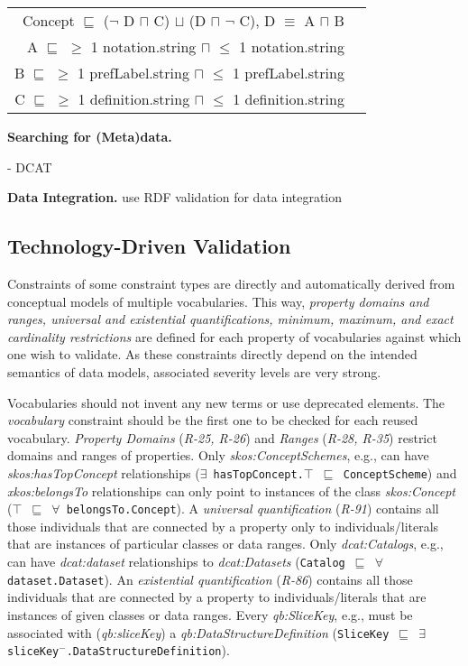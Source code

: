 \documentclass{llncs}
\newcommand{\ms}[1]{\texttt{#1}}
\newenvironment{DL}{
  \vspace{0cm}
  \begin{tabular}{r l}

}{
  \end{tabular}
}
\begin{document}
{{\begin{center}
\begin{DL}
Concept $\sqsubseteq$ ($\neg$ D $\sqcap$ C) $\sqcup$ (D $\sqcap$ $\neg$ C), D $\equiv$ A $\sqcap$ B \\
A $\sqsubseteq$ $\geq$ 1 notation.string $\sqcap$ $\leq$ 1 notation.string \\
B $\sqsubseteq$ $\geq$ 1 prefLabel.string $\sqcap$ $\leq$ 1 prefLabel.string \\
C $\sqsubseteq$ $\geq$ 1 definition.string $\sqcap$ $\leq$ 1 definition.string \\
\end{DL}
\end{center}

\textbf{Searching for (Meta)data.}

- DCAT

\textbf{Data Integration.}
use RDF validation for data integration

\subsection{Technology-Driven Validation}
\label{technology-driven-validation}

Constraints of some constraint types are directly and automatically derived from conceptual models of multiple vocabularies.
This way, \emph{property domains and ranges, universal and existential quantifications, minimum, maximum, and exact cardinality restrictions} are defined for each property of vocabularies against which one wish to validate.
As these constraints directly depend on the intended semantics of data models, associated severity levels are very strong.

Vocabularies should not invent any new terms or use deprecated elements.
The \emph{vocabulary} constraint should be the first one to be checked for each reused vocabulary.
\emph{Property Domains} (\emph{R-25, R-26}) and \emph{Ranges} (\emph{R-28, R-35}) restrict domains and ranges of properties.
Only \emph{skos:ConceptSchemes}, e.g., can have \emph{skos:hasTopConcept} relationships (\ms{$\exists$ hasTopConcept.$\top$ $\sqsubseteq$ ConceptScheme}) and
\emph{xkos:belongsTo} relationships can only point to instances of the class \emph{skos:Concept} (\ms{$\top$ $\sqsubseteq$ $\forall$ belongsTo.Concept}).
A \emph{universal quantification} (\emph{R-91}) contains all those individuals that are connected by a property only to individuals/literals that are instances of particular classes  or data ranges.
Only \emph{dcat:Catalogs}, e.g., can have \emph{dcat:dataset} relationships to \emph{dcat:Datasets} (\ms{Catalog $\sqsubseteq$ $\forall$ dataset.Dataset}).
An \emph{existential quantification} (\emph{R-86}) contains all those individuals that are connected by a property to individuals/literals that are instances of given classes or data ranges.
Every \emph{qb:SliceKey}, e.g., must be associated with (\emph{qb:sliceKey}) a \emph{qb:DataStructureDefinition} (\ms{SliceKey $\sqsubseteq$ $\exists$ sliceKey$^{-}$.DataStructureDefinition}).

}}
\end{document}
